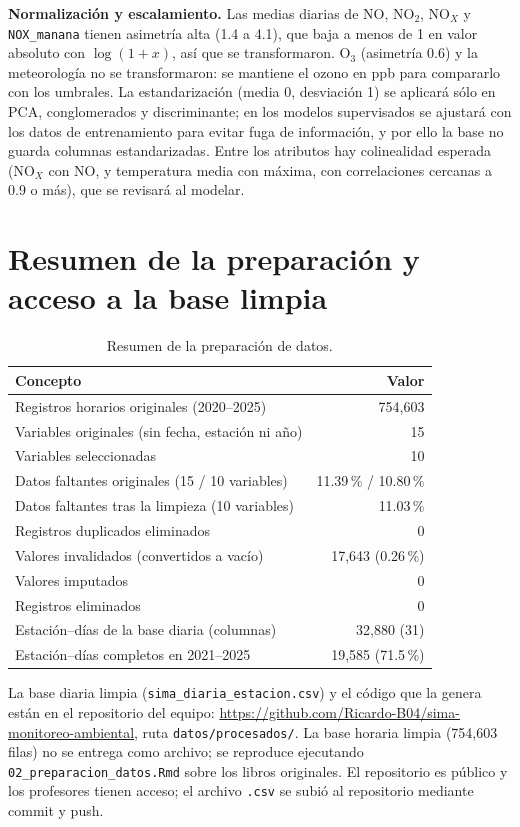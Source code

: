 \documentclass[11pt,letterpaper]{article}
\begin{document}
\textbf{Normalizaci\'on y escalamiento.} Las medias diarias de NO, NO$_2$, NO$_X$ y \texttt{NOX\_manana} tienen asimetr\'ia alta (1.4 a 4.1), que baja a menos de 1 en valor absoluto con $\log(1+x)$, as\'i que se transformaron. O$_3$ (asimetr\'ia 0.6) y la meteorolog\'ia no se transformaron: se mantiene el ozono en ppb para compararlo con los umbrales. La estandarizaci\'on (media 0, desviaci\'on 1) se aplicar\'a s\'olo en PCA, conglomerados y discriminante; en los modelos supervisados se ajustar\'a con los datos de entrenamiento para evitar fuga de informaci\'on, y por ello la base no guarda columnas estandarizadas. Entre los atributos hay colinealidad esperada (NO$_X$ con NO, y temperatura media con m\'axima, con correlaciones cercanas a 0.9 o m\'as), que se revisar\'a al modelar.

\section{Resumen de la preparaci\'on y acceso a la base limpia}
\begin{table}[h]
\centering
\small
\begin{tabular}{@{}lr@{}}
\toprule
Concepto & Valor \\
\midrule
Registros horarios originales (2020--2025) & 754,603 \\
Variables originales (sin fecha, estaci\'on ni a\~no) & 15 \\
Variables seleccionadas & 10 \\
Datos faltantes originales (15 / 10 variables) & 11.39\,\% / 10.80\,\% \\
Datos faltantes tras la limpieza (10 variables) & 11.03\,\% \\
Registros duplicados eliminados & 0 \\
Valores invalidados (convertidos a vac\'io) & 17,643 (0.26\,\%) \\
Valores imputados & 0 \\
Registros eliminados & 0 \\
Estaci\'on--d\'ias de la base diaria (columnas) & 32,880 (31) \\
Estaci\'on--d\'ias completos en 2021--2025 & 19,585 (71.5\,\%) \\
\bottomrule
\end{tabular}
\caption{Resumen de la preparaci\'on de datos.}
\label{tab:resumen}
\end{table}

La base diaria limpia (\texttt{sima\_diaria\_estacion.csv}) y el c\'odigo que la genera est\'an en el repositorio del equipo: \url{https://github.com/Ricardo-B04/sima-monitoreo-ambiental}, ruta \texttt{datos/procesados/}. La base horaria limpia (754,603 filas) no se entrega como archivo; se reproduce ejecutando \texttt{02\_preparacion\_datos.Rmd} sobre los libros originales. El repositorio es p\'ublico y los profesores tienen acceso; el archivo \texttt{.csv} se subi\'o al repositorio mediante commit y push.
\end{document}
